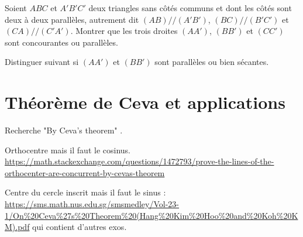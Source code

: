 \begin{exo}
Soient $ABC$ et $A'B'C'$ deux triangles sans côtés communs et dont les côtés sont deux à deux parallèles, autrement dit $(AB)//(A'B')$, $(BC)//(B'C')$ et $(CA)//(C'A')$.
Montrer que les trois droites $(AA')$, $(BB')$ et $(CC')$ sont concourantes ou parallèles.
\begin{center}
\begin{tikzpicture}
\end{tikzpicture}
\end{center}
\begin{hint}
Distinguer suivant si  $(AA')$ et $(BB')$ sont parallèles ou bien sécantes.
\end{hint}
\begin{sol}
\end{sol}
\end{exo}

\begin{exo}
\begin{center}
\begin{tikzpicture}
\end{tikzpicture}
\end{center}
\begin{hint}
\end{hint}
\begin{sol}
\end{sol}
\end{exo}

\begin{exo}
\begin{center}
\begin{tikzpicture}
\end{tikzpicture}
\end{center}
\begin{hint}
\end{hint}
\begin{sol}
\end{sol}
\end{exo}


\section{Théorème de Ceva et applications}

Recherche "By Ceva's theorem" .

Orthocentre mais il faut le cosinus. \url{https://math.stackexchange.com/questions/1472793/prove-the-lines-of-the-orthocenter-are-concurrent-by-cevas-theorem}

Centre du cercle inscrit mais il faut le sinus : \url{https://sms.math.nus.edu.sg/smsmedley/Vol-23-1/On%20Ceva%27s%20Theorem%20(Hang%20Kim%20Hoo%20and%20Koh%20KM).pdf} qui contient d'autres exos.

